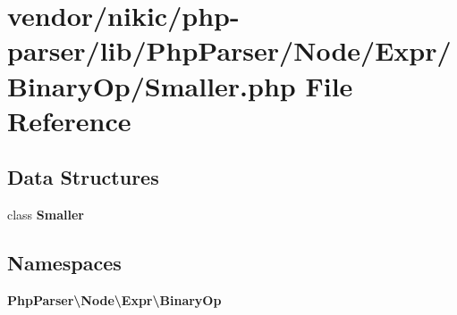 \section{vendor/nikic/php-\/parser/lib/\+Php\+Parser/\+Node/\+Expr/\+Binary\+Op/\+Smaller.php File Reference}
\label{_smaller_8php}
\subsection*{Data Structures}
\begin{DoxyCompactItemize}
\item 
class {\bf Smaller}
\end{DoxyCompactItemize}
\subsection*{Namespaces}
\begin{DoxyCompactItemize}
\item 
 {\bf Php\+Parser\textbackslash{}\+Node\textbackslash{}\+Expr\textbackslash{}\+Binary\+Op}
\end{DoxyCompactItemize}
